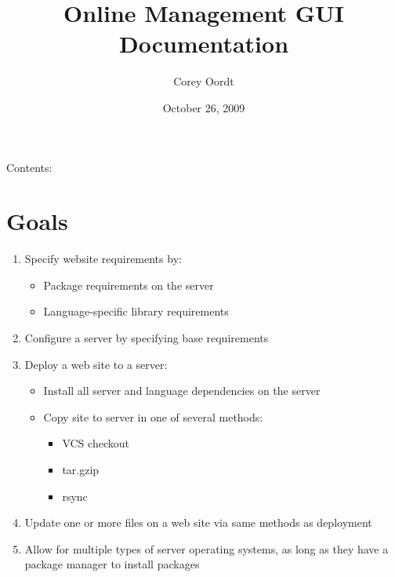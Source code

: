 \documentclass[letterpaper,10pt,english]{manual}
\title{Online Management GUI Documentation}
\date{October 26, 2009}
\author{Corey Oordt}
\begin{document}
\maketitle
\tableofcontents
\hypertarget{--doc-index}{}


Contents:

\resetcurrentobjects
\hypertarget{--doc-goals}{}

\chapter{Goals}
\begin{enumerate}
\item {} 
Specify website requirements by:
\begin{itemize}
\item {} 
Package requirements on the server

\item {} 
Language-specific library requirements

\end{itemize}

\item {} 
Configure a server by specifying base requirements

\item {} 
Deploy a web site to a server:
\begin{itemize}
\item {} 
Install all server and language dependencies on the server

\item {} 
Copy site to server in one of several methods:
\begin{itemize}
\item {} 
VCS checkout

\item {} 
tar.gzip

\item {} 
rsync

\end{itemize}

\end{itemize}

\item {} 
Update one or more files on a web site via same methods as deployment

\item {} 
Allow for multiple types of server operating systems, as long as they have a package manager to install packages

\end{enumerate}
\end{document}
